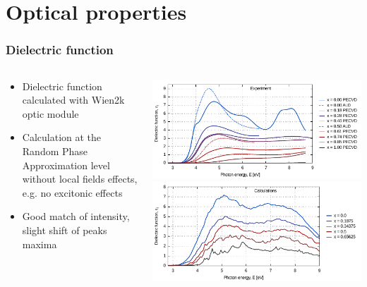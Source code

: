 \documentclass[noamsthm,8pt,t]{beamer}
\begin{document}
\section{Optical properties}

\begin{frame}
   \frametitle{Dielectric function}

   \begin{columns}
      \begin{column}{0.3\textwidth}
         \begin{itemize}
            \item Dielectric function calculated with Wien2k optic module 
            \item Calculation at the Random Phase Approximation level without local fields effects, e.g. no excitonic effects
            \item Good match of intensity, slight shift of peaks maxima
         \end{itemize}
      \end{column}
      \begin{column}{0.7\textwidth}
         \begin{center}
            \includegraphics[width=\linewidth]{figures/epsi.pdf}
            \newline
            \includegraphics[width=\linewidth]{figures/epsi-calc.pdf}
         \end{center}
      \end{column}
   \end{columns}
\end{frame}
\end{document}
